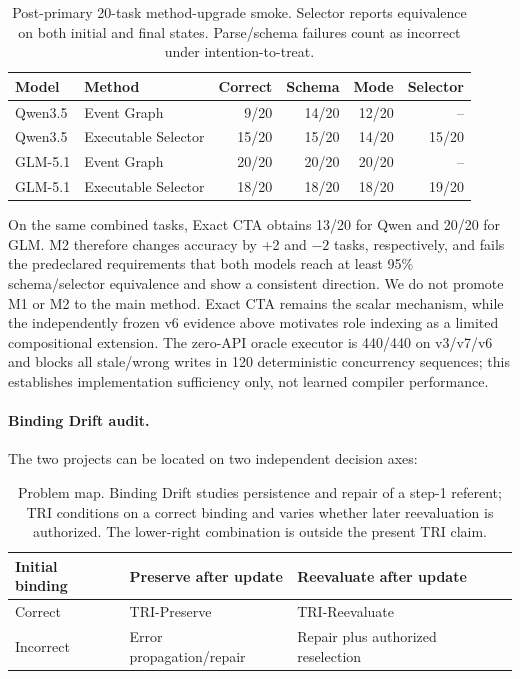 \documentclass[10pt]{article}
\begin{document}
\begin{table}[h]
\centering
\small
\begin{tabular}{llrrrr}
\toprule
Model & Method & Correct & Schema & Mode & Selector \\
\midrule
Qwen3.5 & Event Graph & 9/20 & 14/20 & 12/20 & -- \\
Qwen3.5 & Executable Selector & 15/20 & 15/20 & 14/20 & 15/20 \\
GLM-5.1 & Event Graph & 20/20 & 20/20 & 20/20 & -- \\
GLM-5.1 & Executable Selector & 18/20 & 18/20 & 18/20 & 19/20 \\
\bottomrule
\end{tabular}
\caption{Post-primary 20-task method-upgrade smoke. Selector reports equivalence on both initial
and final states. Parse/schema failures count as incorrect under intention-to-treat.}
\end{table}

On the same combined tasks, Exact CTA obtains 13/20 for Qwen and 20/20 for GLM. M2 therefore
changes accuracy by +2 and $-2$ tasks, respectively, and fails the predeclared requirements that
both models reach at least 95\% schema/selector equivalence and show a consistent direction.
We do not promote M1 or M2 to the main method. Exact CTA remains the scalar mechanism, while the
independently frozen v6 evidence above motivates role indexing as a limited compositional
extension. The zero-API oracle executor is 440/440 on v3/v7/v6 and blocks all stale/wrong writes
in 120 deterministic concurrency sequences; this establishes implementation sufficiency only,
not learned compiler performance.

\paragraph{Binding Drift audit.}
The two projects can be located on two independent decision axes:
\begin{table}[h]
\centering
\small
\begin{tabular}{lll}
\toprule
Initial binding & Preserve after update & Reevaluate after update \\
\midrule
Correct & TRI-Preserve & TRI-Reevaluate \\
Incorrect & Error propagation/repair & Repair plus authorized reselection \\
\bottomrule
\end{tabular}
\caption{Problem map. Binding Drift studies persistence and repair of a step-1 referent; TRI
conditions on a correct binding and varies whether later reevaluation is authorized. The
lower-right combination is outside the present TRI claim.}
\end{table}
\end{document}
